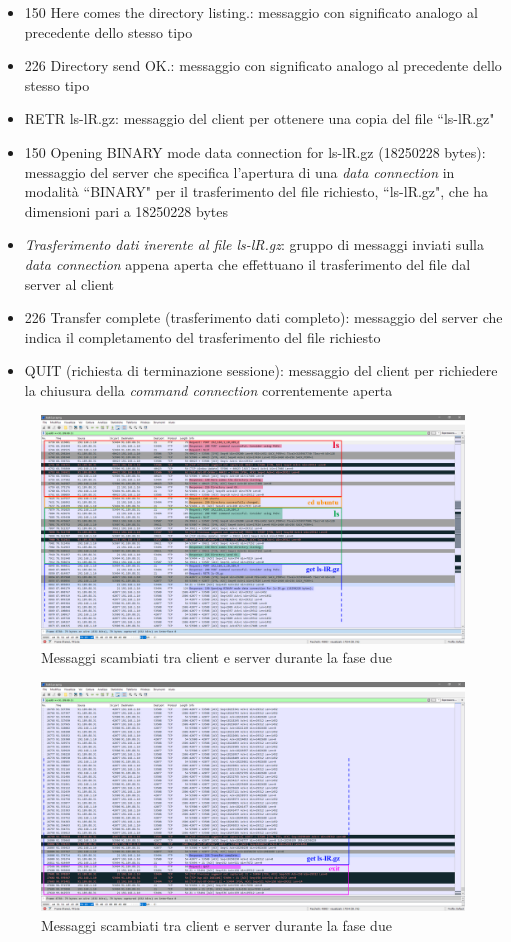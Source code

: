 \documentclass[a4paper, 12pt]{report}
\begin{document}
\begin{enumerate}
\begin{itemize}
	        \item 150 Here comes the directory listing.: messaggio con significato analogo al precedente dello stesso tipo
	        \item 226 Directory send OK.: messaggio con significato analogo al precedente dello stesso tipo
            \item RETR ls-lR.gz: messaggio del client per ottenere una copia del file ``ls-lR.gz"
            \item 150 Opening BINARY mode data connection for ls-lR.gz (18250228 bytes): messaggio del server che specifica l'apertura di una \textit{data connection}
            in modalità ``BINARY" per il trasferimento del file richiesto, ``ls-lR.gz", che ha dimensioni pari a 18250228 bytes
            \item \textit{Trasferimento dati inerente al file ls-lR.gz}: gruppo di messaggi inviati sulla \textit{data connection} appena aperta che effettuano il
            trasferimento del file dal server al client
            \item 226 Transfer complete (trasferimento dati completo): messaggio del server che indica il completamento del trasferimento del file richiesto
            \item QUIT (richiesta di terminazione sessione): messaggio del client per richiedere la chiusura della \textit{command connection} correntemente aperta
        \end{itemize}
\end{enumerate}

\begin{figure}[H]
	\centering
	\includegraphics[width=\linewidth]{images/image2_2.png}
	\caption{Messaggi scambiati tra client e server durante la fase due}
\end{figure}

\begin{figure}[H]
	\centering
	\includegraphics[width=\linewidth]{images/image2_3.png}
	\caption{Messaggi scambiati tra client e server durante la fase due}
\end{figure}
\end{document}
